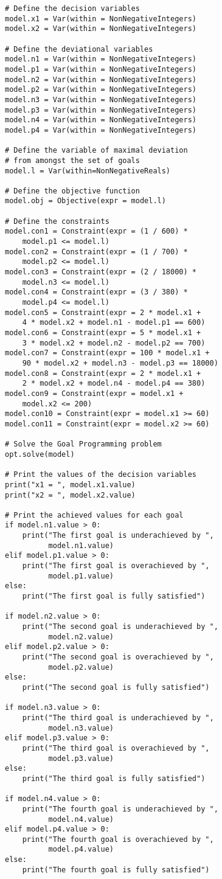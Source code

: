 \documentclass[twoside,twocolumn]{article}
\begin{document}
\begin{lstlisting}
# Define the decision variables
model.x1 = Var(within = NonNegativeIntegers)
model.x2 = Var(within = NonNegativeIntegers)

# Define the deviational variables
model.n1 = Var(within = NonNegativeIntegers)
model.p1 = Var(within = NonNegativeIntegers)
model.n2 = Var(within = NonNegativeIntegers)
model.p2 = Var(within = NonNegativeIntegers)
model.n3 = Var(within = NonNegativeIntegers)
model.p3 = Var(within = NonNegativeIntegers)
model.n4 = Var(within = NonNegativeIntegers)
model.p4 = Var(within = NonNegativeIntegers)

# Define the variable of maximal deviation
# from amongst the set of goals
model.l = Var(within=NonNegativeReals)

# Define the objective function
model.obj = Objective(expr = model.l)

# Define the constraints
model.con1 = Constraint(expr = (1 / 600) *
    model.p1 <= model.l)
model.con2 = Constraint(expr = (1 / 700) *
    model.p2 <= model.l)
model.con3 = Constraint(expr = (2 / 18000) *
    model.n3 <= model.l)
model.con4 = Constraint(expr = (3 / 380) *
    model.p4 <= model.l)
model.con5 = Constraint(expr = 2 * model.x1 +
    4 * model.x2 + model.n1 - model.p1 == 600)
model.con6 = Constraint(expr = 5 * model.x1 +
    3 * model.x2 + model.n2 - model.p2 == 700)
model.con7 = Constraint(expr = 100 * model.x1 +
    90 * model.x2 + model.n3 - model.p3 == 18000)
model.con8 = Constraint(expr = 2 * model.x1 +
    2 * model.x2 + model.n4 - model.p4 == 380)
model.con9 = Constraint(expr = model.x1 +
    model.x2 <= 200)
model.con10 = Constraint(expr = model.x1 >= 60)
model.con11 = Constraint(expr = model.x2 >= 60)

# Solve the Goal Programming problem
opt.solve(model)

# Print the values of the decision variables
print("x1 = ", model.x1.value)
print("x2 = ", model.x2.value)

# Print the achieved values for each goal
if model.n1.value > 0:
    print("The first goal is underachieved by ",
          model.n1.value)
elif model.p1.value > 0:
    print("The first goal is overachieved by ",
          model.p1.value)
else:
    print("The first goal is fully satisfied")

if model.n2.value > 0:
    print("The second goal is underachieved by ",
          model.n2.value)
elif model.p2.value > 0:
    print("The second goal is overachieved by ",
          model.p2.value)
else:
    print("The second goal is fully satisfied")

if model.n3.value > 0:
    print("The third goal is underachieved by ",
          model.n3.value)
elif model.p3.value > 0:
    print("The third goal is overachieved by ",
          model.p3.value)
else:
    print("The third goal is fully satisfied")

if model.n4.value > 0:
    print("The fourth goal is underachieved by ",
          model.n4.value)
elif model.p4.value > 0:
    print("The fourth goal is overachieved by ",
          model.p4.value)
else:
    print("The fourth goal is fully satisfied")
\end{lstlisting}
\end{document}
